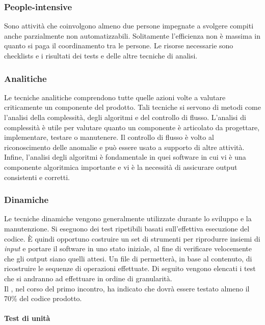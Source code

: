 		\subsubsection{People-intensive}

		Sono attività che coinvolgono almeno due persone impegnate a svolgere compiti anche parzialmente non automatizzabili. Solitamente l'efficienza non è massima in quanto si paga il coordinamento tra le persone. Le risorse necessarie sono checklists e i risultati dei tests e delle altre tecniche di analisi.
	
		\subsubsection{Analitiche}

		Le tecniche analitiche comprendono tutte quelle azioni volte a valutare criticamente un componente del prodotto. Tali tecniche si servono di metodi come l'analisi della complessità, degli algoritmi e del controllo di flusso. L'analisi di complessità è utile per valutare quanto un componente è articolato da progettare, implementare, testare o manutenere. Il controllo di flusso è volto al riconoscimento delle anomalie e può essere usato a supporto di altre attività. Infine, l'analisi degli algoritmi è fondamentale in quei software in cui vi è una componente algoritmica importante e vi è la necessità di assicurare output consistenti e corretti. 
				
		\subsubsection{Dinamiche}

		Le tecniche dinamiche vengono generalmente utilizzate durante lo sviluppo e la manutenzione. Si eseguono dei test ripetibili basati sull'effettiva esecuzione del codice. È quindi opportuno costruire un set di strumenti per riprodurre insiemi di \emph{input} e portare il software in uno stato iniziale, al fine di verificare velocemente che gli output siano quelli attesi. Un file di  permetterà, in base al contenuto, di ricostruire le sequenze di operazioni effettuate. Di seguito vengono elencati i test che si andranno ad effettuare in ordine di granularità.\\
		Il , nel corso del primo incontro, ha indicato che dovrà essere testato almeno il  70\% del codice prodotto.
		
			\paragraph{Test di unità} \mbox{} \\

